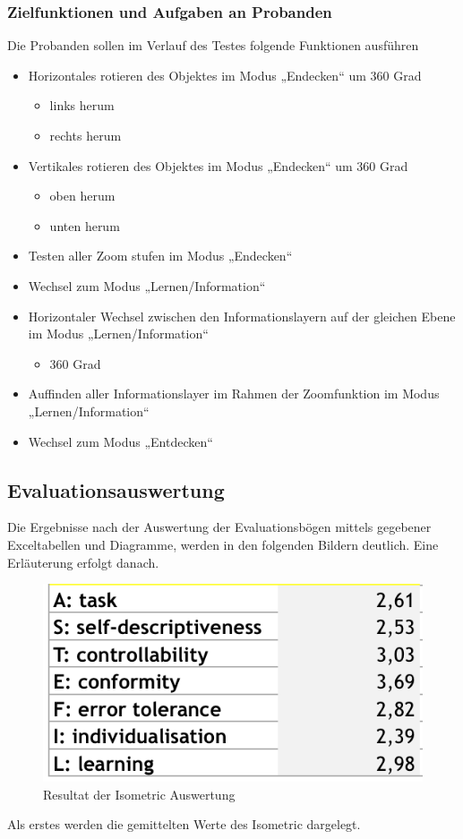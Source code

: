 \documentclass[runningheads,a4paper, 12pt]{llncs}
\begin{document}
\subsubsection{Zielfunktionen und Aufgaben an Probanden}
Die Probanden sollen im Verlauf des Testes folgende Funktionen ausführen
	\begin{itemize}
	\item Horizontales rotieren des Objektes im Modus „Endecken“ um 360 Grad
	\begin{itemize}
		\item links herum
		\item rechts herum
	\end{itemize}
	\item Vertikales rotieren des Objektes im Modus „Endecken“ um 360 Grad
	\begin{itemize}
		\item oben herum
		\item unten herum
	\end{itemize}
	\item Testen aller Zoom stufen im Modus „Endecken“
	\item Wechsel zum Modus „Lernen/Information“
	\item Horizontaler Wechsel zwischen den Informationslayern auf der gleichen Ebene im Modus „Lernen/Information“
	\begin{itemize}
		\item 360 Grad
	\end{itemize}
	\item Auffinden aller Informationslayer im Rahmen der Zoomfunktion im Modus „Lernen/Information“
	\item Wechsel zum Modus „Entdecken“
\end{itemize}
\subsection{Evaluationsauswertung}
Die Ergebnisse nach der Auswertung der Evaluationsbögen mittels gegebener Exceltabellen und Diagramme, werden in den folgenden Bildern deutlich. Eine Erläuterung erfolgt danach.

\begin{figure}[H]
	\centering
	\includegraphics[angle=0,scale=1]{iso_metric_result}
	\caption{Resultat der Isometric Auswertung}
	\label{fig:result1}
\end{figure}
Als erstes werden die gemittelten Werte des Isometric dargelegt.
\end{document}
